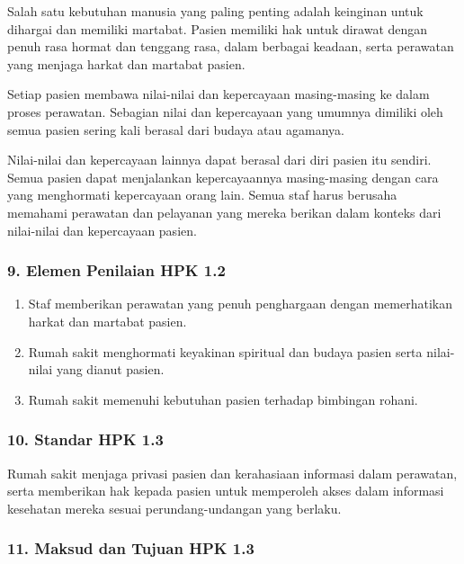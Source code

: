 \documentclass[
]{book}
\providecommand{\tightlist}{%
  \setlength{\itemsep}{0pt}\setlength{\parskip}{0pt}}
\begin{document}
Salah satu kebutuhan manusia yang paling penting adalah keinginan untuk dihargai dan memiliki martabat. Pasien memiliki hak untuk dirawat dengan penuh rasa hormat dan tenggang rasa, dalam berbagai keadaan, serta perawatan yang menjaga harkat dan martabat pasien.

Setiap pasien membawa nilai-nilai dan kepercayaan masing-masing ke dalam proses perawatan. Sebagian nilai dan kepercayaan yang umumnya dimiliki oleh semua pasien sering kali berasal dari budaya atau agamanya.

Nilai-nilai dan kepercayaan lainnya dapat berasal dari diri pasien itu sendiri. Semua pasien dapat menjalankan kepercayaannya masing-masing dengan cara yang menghormati kepercayaan orang lain. Semua staf harus berusaha memahami perawatan dan pelayanan yang mereka berikan dalam konteks dari nilai-nilai dan kepercayaan pasien.

\hypertarget{elemen-penilaian-hpk-1.2}{%
\subsubsection*{9. Elemen Penilaian HPK 1.2}\label{elemen-penilaian-hpk-1.2}}

\begin{enumerate}
\def\labelenumi{\alph{enumi}.}
\tightlist
\item
  Staf memberikan perawatan yang penuh penghargaan dengan memerhatikan harkat dan martabat pasien.
\item
  Rumah sakit menghormati keyakinan spiritual dan budaya pasien serta nilai-nilai yang dianut pasien.
\item
  Rumah sakit memenuhi kebutuhan pasien terhadap bimbingan rohani.
\end{enumerate}

\hypertarget{standar-hpk-1.3}{%
\subsubsection*{10. Standar HPK 1.3}\label{standar-hpk-1.3}}

Rumah sakit menjaga privasi pasien dan kerahasiaan informasi dalam perawatan, serta memberikan hak kepada pasien untuk memperoleh akses dalam informasi kesehatan mereka sesuai perundang-undangan yang berlaku.

\hypertarget{maksud-dan-tujuan-hpk-1.3}{%
\subsubsection*{11. Maksud dan Tujuan HPK 1.3}\label{maksud-dan-tujuan-hpk-1.3}}
\end{document}

